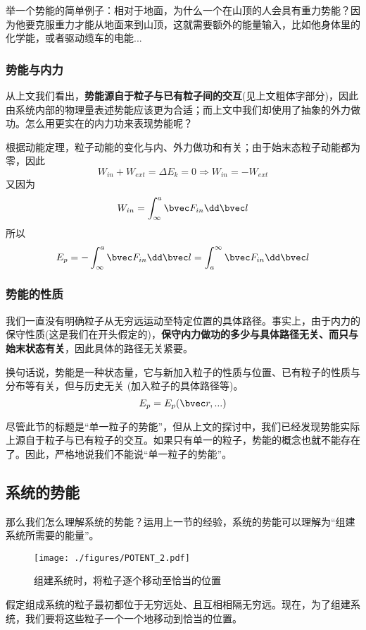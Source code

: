 举一个势能的简单例子：相对于地面，为什么一个在山顶的人会具有重力势能？因为他要克服重力才能从地面来到山顶，这就需要额外的能量输入，比如他身体里的化学能，或者驱动缆车的电能...

\subsubsection{势能与内力}
从上文我们看出，\textbf{势能源自于粒子与已有粒子间的交互}(见上文粗体字部分)，因此由系统内部的物理量表述势能应该更为合适；而上文中我们却使用了抽象的外力做功。怎么用更实在的内力功来表现势能呢？

根据动能定理，粒子动能的变化与内、外力做功和有关；由于始末态粒子动能都为零，因此
$$W_{in} + W_{ext} = \Delta E_k = 0 \Rightarrow W_{in} = -W_{ext}$$
又因为
$$W_{in} = \int^a_\infty \bvec F_{in} \dd \bvec l $$
所以
$$E_p = - \int^a_\infty \bvec F_{in} \dd \bvec l = \int^\infty_a \bvec F_{in} \dd \bvec l$$

\subsubsection{势能的性质}
我们一直没有明确粒子从无穷远运动至特定位置的具体路径。事实上，由于内力的保守性质(这是我们在开头假定的)，\textbf{保守内力做功的多少与具体路径无关、而只与始末状态有关}，因此具体的路径无关紧要。%

换句话说，势能是一种状态量，它与新加入粒子的性质与位置、已有粒子的性质与分布等有关，但与历史无关 (加入粒子的具体路径等)。
$$E_p=E_p(\bvec r,...)$$

尽管此节的标题是“单一粒子的势能”，但从上文的探讨中，我们已经发现势能实际上源自于粒子与已有粒子的交互。如果只有单一的粒子，势能的概念也就不能存在了。因此，严格地说我们不能说“单一粒子的势能”。

\subsection{系统的势能}
那么我们怎么理解系统的势能？运用上一节的经验，系统的势能可以理解为“组建系统所需要的能量”。

\begin{figure}[ht]
\centering
\texttt{[image: ./figures/POTENT\_2.pdf]}
\caption{组建系统时，将粒子逐个移动至恰当的位置} \label{POTENT_fig2}
\end{figure}
假定组成系统的粒子最初都位于无穷远处、且互相相隔无穷远。现在，为了组建系统，我们要将这些粒子一个一个地移动到恰当的位置。

